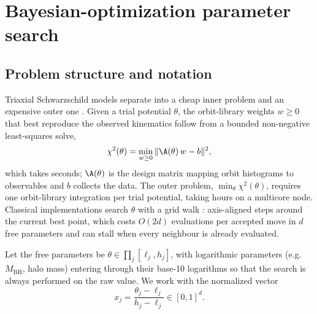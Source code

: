 %

\section{Bayesian-optimization parameter search}
\label{app:bayesopt}

\subsection{Problem structure and notation}
\label{app:bayesopt:structure}
Triaxial Schwarzschild models separate into a cheap inner problem and an
expensive outer one \citep{vdbosch2019dynamite}. Given a trial potential
$\theta$, the orbit-library weights $w \ge 0$ that best reproduce the
observed kinematics follow from a bounded non-negative least-squares
solve,
\begin{equation}
  \chi^2(\theta) = \min_{w \ge 0} \|\A(\theta)\, w - b\|^2 ,
\end{equation}
which takes seconds; $\A(\theta)$ is the design matrix mapping orbit
histograms to observables and $b$ collects the data. The outer problem,
$\min_\theta \chi^2(\theta)$, requires one orbit-library integration per
trial potential, taking hours on a multicore node. Classical
implementations search $\theta$ with a grid walk \citep{zhu2018crcut}:
axis-aligned steps around the current best point, which costs
$O(2d)$ evaluations per accepted move in $d$ free parameters and can
stall when every neighbour is already evaluated.

Let the free parameters be $\theta \in \prod_j [\ell_j, h_j]$, with
logarithmic parameters (e.g.\ $M_\mathrm{BH}$, halo mass) entering
through their base-10 logarithms so that the search is always performed
on the raw value. We work with the normalized vector
\begin{equation}
  x_j = \frac{\theta_j - \ell_j}{h_j - \ell_j} \in [0,1]^d .
  \label{eq:norm}
\end{equation}

